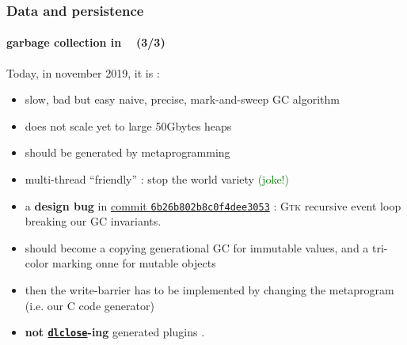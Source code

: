 \documentclass[xcolor=svgnames,final,smaller,a4]{beamer}
\begin{document}
\begin{frame}
    \frametitle{Data and persistence}
    \framesubtitle{garbage collection in \Bismon ~ (3/3)}

    Today, in november 2019, it is :
    \begin{itemize}

    \item slow, bad but easy naive, precise, mark-and-sweep GC algorithm

    \item does not scale yet to large 50Gbytes heaps

    \item should be generated by metaprogramming

    \item multi-thread ``friendly'' \smiley{} : stop the world variety \textcolor{green}{(joke!)}
      
        \item a \textbf{design bug} in {\Bismon}
          {\href{https://github.com/bstarynk/bismon/commit/6b26b802b8c0f4dee3053afea9fe3ef6e3073dca}{commit
            \texttt{6b26b802b8c0f4dee3053}}} : \textsc{Gtk} recursive
          event loop breaking our GC invariants.
        \item should become a copying generational GC for immutable values, and a tri-color marking onne for mutable objects
        \item then the write-barrier has to be implemented by changing the metaprogram (i.e. our C code generator)
          \item \textbf{not \href{http://man7.org/linux/man-pages/man3/dlclose.3.html}{\texttt{dlclose}}-ing} generated plugins {}.

    \end{itemize}
\end{frame}

\end{document}
